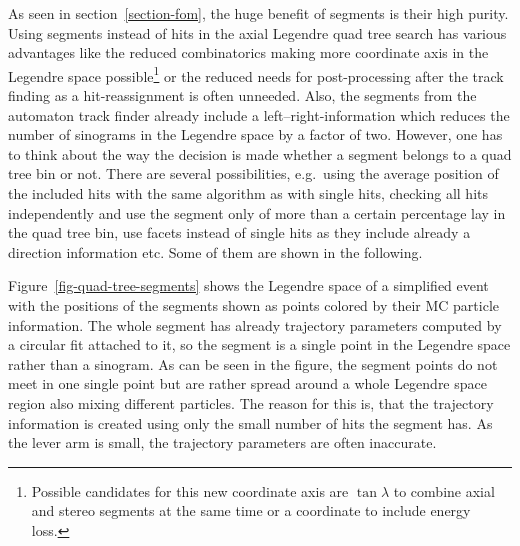 As seen in section~\ref{section-fom}, the huge benefit of segments is their high purity. Using segments instead of hits in the axial Legendre quad tree search has various advantages like the reduced combinatorics making more coordinate axis in the Legendre space possible\footnote{Possible candidates for this new coordinate axis are $\tan \lambda$ to combine axial and stereo segments at the same time or a coordinate to include energy loss.} or the reduced needs for post-processing after the track finding as a hit-reassignment is often unneeded. Also, the segments from the automaton track finder already include a left--right-information which reduces the number of sinograms in the Legendre space by a factor of two. However, one has to think about the way the decision is made whether a segment belongs to a quad tree bin or not. There are several possibilities, e.g.\ using the average position of the included hits with the same algorithm as with single hits, checking all hits independently and use the segment only of more than a certain percentage lay in the quad tree bin, use facets instead of single hits as they include already a direction information etc. Some of them are shown in the following.

Figure~\ref{fig-quad-tree-segments} shows the Legendre space of a simplified event with the positions of the segments shown as points colored by their MC particle information. The whole segment has already trajectory parameters computed by a circular fit attached to it, so the segment is a single point in the Legendre space rather than a sinogram. As can be seen in the figure, the segment points do not meet in one single point but are rather spread around a whole Legendre space region also mixing different particles. The reason for this is, that the trajectory information is created using only the small number of hits the segment has. As the lever arm is small, the trajectory parameters are often inaccurate.


